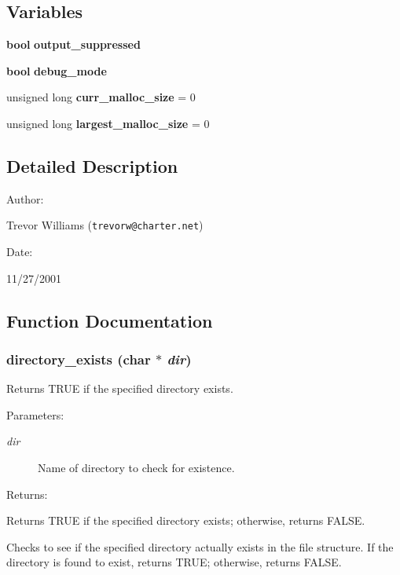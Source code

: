 \subsection*{Variables}
\begin{CompactItemize}
\item 
{\bf bool} {\bf output\_\-suppressed}
\item 
{\bf bool} {\bf debug\_\-mode}
\item 
unsigned long {\bf curr\_\-malloc\_\-size} = 0
\item 
unsigned long {\bf largest\_\-malloc\_\-size} = 0
\end{CompactItemize}


\subsection{Detailed Description}


\begin{Desc}
\item[Author: ]\par
Trevor Williams ({\tt trevorw@charter.net}) \end{Desc}
\begin{Desc}
\item[Date: ]\par
11/27/2001\end{Desc}


\subsection{Function Documentation}
\subsubsection{ directory\_\-exists (char $\ast$ {\em dir})}\label{util_8c_a9}


Returns TRUE if the specified directory exists.

\begin{Desc}
\item[Parameters: ]\par
\begin{description}
\item[{\em 
dir}]Name of directory to check for existence. \end{description}
\end{Desc}
\begin{Desc}
\item[Returns: ]\par
Returns TRUE if the specified directory exists; otherwise, returns FALSE.\end{Desc}
Checks to see if the specified directory actually exists in the file structure. If the directory is found to exist, returns TRUE; otherwise, returns FALSE. 
